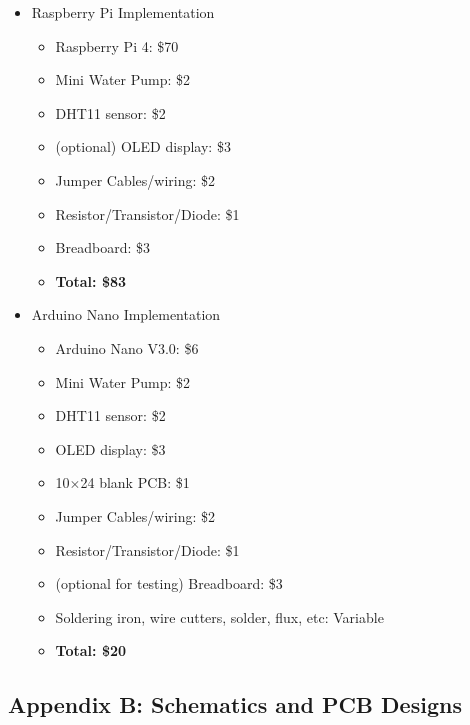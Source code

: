 \documentclass{article}
\begin{document}
	\begin{multicols}{2}
		\begin{itemize}
			\item Raspberry Pi Implementation
			\begin{itemize}
				\item Raspberry Pi 4: \$70
				\item Mini Water Pump: \$2
				\item DHT11 sensor: \$2
				\item (optional) OLED display: \$3
				\item Jumper Cables/wiring: \$2
				\item Resistor/Transistor/Diode: \$1
				\item Breadboard: \$3
				\item \textbf{Total: \$83}
			\end{itemize}
			
			\columnbreak
			
			\item Arduino Nano Implementation
			\begin{itemize}
				\item Arduino Nano V3.0: \$6
				\item Mini Water Pump: \$2
				\item DHT11 sensor: \$2
				\item OLED display: \$3
				\item 10$\times$24 blank PCB: \$1
				\item Jumper Cables/wiring: \$2
				\item Resistor/Transistor/Diode: \$1
				\item (optional for testing) Breadboard: \$3
				\item Soldering iron, wire cutters, solder, flux, etc: Variable
				\item \textbf{Total: \$20}
			\end{itemize}
		\end{itemize}
	\end{multicols}
	
	\subsection{Appendix B: Schematics and PCB Designs \label{appendix:schematics}}
	
\end{document}
